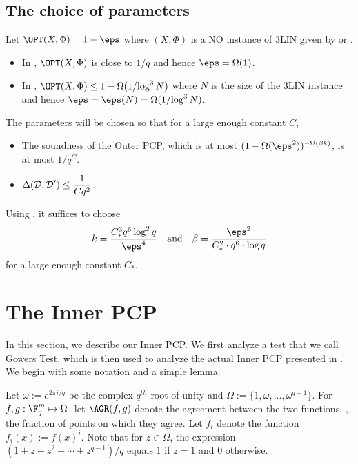 \subsection{The choice of parameters}\label{sec:param}

Let $\OPT(X,\Phi)=1-\eps$ where $(X,\Phi)$ is a NO instance of 3LIN given by  or
.
\begin{itemize}
\item In , $\OPT(X,\Phi)$ is close to ${1}/{q}$ and hence
$\eps = \Omega(1)$.
\item In ,
$\OPT(X,\Phi) \leq 1-\Omega({1}/{\log^3 N})$ where $N$ is the
size of the 3LIN instance and hence $\eps = \eps(N) =  \Omega({1}/{\log^3 N})$.
\end{itemize}
The parameters will be chosen so that for a large enough constant $C$,
\begin{itemize}
\item The soundness of the Outer PCP, which is at most $(1-\Omega(\eps^2))^{-\Omega(\beta k)}$,
      is at most ${1}/{q^{C}}$.
\item $\displaystyle \Delta({\cal D}, {\cal D}') \leq \frac{1}{C q^2}$.
\end{itemize}
Using ,
it suffices to choose 
\[
k = \frac{C_*^3  q^6 \log^2 q}{\eps^4} \quad \text{and}\quad
\beta = \frac{\eps^2}{C_*^2 \cdot q^6 \cdot \log q}
\]
for a large enough constant $C_*$.







%
%
%
%
%
%
%
%
%
%
%
%
%
%



\section{The Inner PCP}

In this section, we describe our Inner PCP\@. We first analyze a test that we call Gowers Test,
which is then used to analyze the actual Inner PCP presented in . We begin with
some notation and a simple lemma.

Let $\omega := e^{2\pi i/q}$ be the complex $q^{th}$ root of unity and $\Omega := \{1, \omega,
\ldots, \omega^{q-1} \}$. For $f, g : \F_q^m \mapsto \Omega$, let $\AGR(f,g)$ denote the agreement
between the two functions, \ie, the fraction of points on which they agree.
Let $f_i$ denote the function $f_i(x) := f(x)^i$. Note that for $z \in \Omega$, the expression
$(1+z+z^2+\cdots+z^{q-1})/q$ equals $1$ if $z=1$ and $0$ otherwise.


